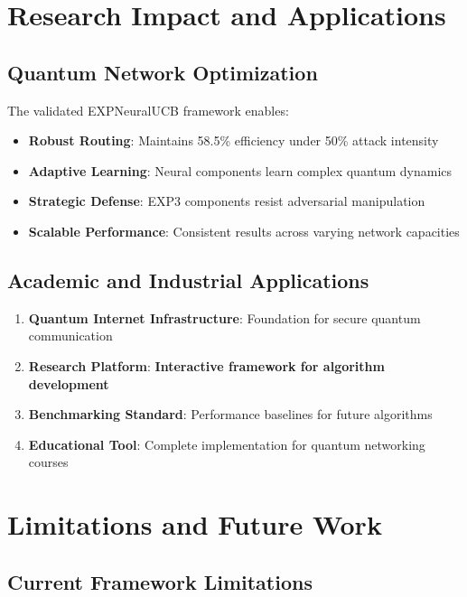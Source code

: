 \documentclass[11pt,a4paper]{article}
\newcommand{\colab}[1]{\textcolor{colabcolor}{\textbf{#1}}}
\begin{document}
\section{Research Impact and Applications}

\subsection{Quantum Network Optimization}

The validated EXPNeuralUCB framework enables:

\begin{itemize}
\item \textbf{Robust Routing}: Maintains 58.5\% efficiency under 50\% attack intensity
\item \textbf{Adaptive Learning}: Neural components learn complex quantum dynamics
\item \textbf{Strategic Defense}: EXP3 components resist adversarial manipulation
\item \textbf{Scalable Performance}: Consistent results across varying network capacities
\end{itemize}

\subsection{Academic and Industrial Applications}

\begin{enumerate}
\item \textbf{Quantum Internet Infrastructure}: Foundation for secure quantum communication
\item \textbf{Research Platform}: \colab{Interactive framework for algorithm development}
\item \textbf{Benchmarking Standard}: Performance baselines for future algorithms
\item \textbf{Educational Tool}: Complete implementation for quantum networking courses
\end{enumerate}

\section{Limitations and Future Work}

\subsection{Current Framework Limitations}
\end{document}
